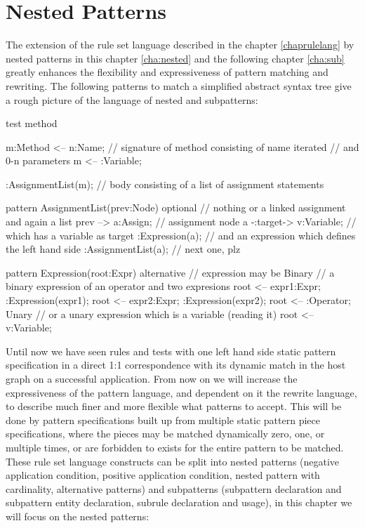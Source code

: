 \chapter{Nested Patterns}
\label{cha:nested}

The extension of the rule set language described in the chapter \ref{chaprulelang} by nested patterns in this chapter \ref{cha:nested} and the following chapter \ref{cha:sub} greatly enhances the flexibility and expressiveness of pattern matching and rewriting.
The following patterns to match a simplified abstract syntax tree give a rough picture of the language of nested and subpatterns:
  \begin{example} \label{ex:proggraph}
    \begin{grgen}
test method
{
  m:Method <-- n:Name; // signature of method consisting of name
  iterated { // and 0-n parameters
    m <-- :Variable;
  }  
  
  :AssignmentList(m); // body consisting of a list of assignment statements
}

pattern AssignmentList(prev:Node)
{
  optional { // nothing or a linked assignment and again a list
    prev --> a:Assign; // assignment node 
    a -:target-> v:Variable; // which has a variable as target 
    :Expression(a);  // and an expression which defines the left hand side 
    :AssignmentList(a); // next one, plz
  }
}

pattern Expression(root:Expr)
{
  alternative { // expression may be
    Binary { // a binary expression of an operator and two expresions
      root <-- expr1:Expr;
      :Expression(expr1);
      root <-- expr2:Expr;
      :Expression(expr2);
      root <-- :Operator;
    }
    Unary { // or a unary expression which is a variable (reading it)
      root <-- v:Variable;
    }
  }
}
    \end{grgen}
  \end{example}\label{introexample}


Until now we have seen rules and tests with one left hand side static pattern specification in a direct 1:1 correspondence with its dynamic match in the host graph on a successful application.
From now on we will increase the expressiveness of the pattern language, and dependent on it the rewrite language, to describe much finer and more flexible what patterns to accept.
This will be done by pattern specifications built up from multiple static pattern piece specifications, where the pieces may be matched dynamically zero, one, or multiple times, or are forbidden to exists for the entire pattern to be matched.
These rule set language constructs can be split into nested patterns (negative application condition, positive application condition, nested pattern with cardinality, alternative patterns) and subpatterns (subpattern declaration and subpattern entity declaration, subrule declaration and usage), in this chapter we will focus on the nested patterns:

